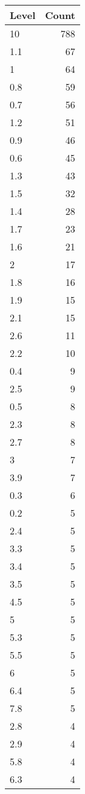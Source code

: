 \begin{table}[ht]
\centering
\begin{tabular}{lr}
  \hline
Level & Count \\ 
  \hline
10 & 788 \\ 
  1.1 &  67 \\ 
  1 &  64 \\ 
  0.8 &  59 \\ 
  0.7 &  56 \\ 
  1.2 &  51 \\ 
  0.9 &  46 \\ 
  0.6 &  45 \\ 
  1.3 &  43 \\ 
  1.5 &  32 \\ 
  1.4 &  28 \\ 
  1.7 &  23 \\ 
  1.6 &  21 \\ 
  2 &  17 \\ 
  1.8 &  16 \\ 
  1.9 &  15 \\ 
  2.1 &  15 \\ 
  2.6 &  11 \\ 
  2.2 &  10 \\ 
  0.4 &   9 \\ 
  2.5 &   9 \\ 
  0.5 &   8 \\ 
  2.3 &   8 \\ 
  2.7 &   8 \\ 
  3 &   7 \\ 
  3.9 &   7 \\ 
  0.3 &   6 \\ 
  0.2 &   5 \\ 
  2.4 &   5 \\ 
  3.3 &   5 \\ 
  3.4 &   5 \\ 
  3.5 &   5 \\ 
  4.5 &   5 \\ 
  5 &   5 \\ 
  5.3 &   5 \\ 
  5.5 &   5 \\ 
  6 &   5 \\ 
  6.4 &   5 \\ 
  7.8 &   5 \\ 
  2.8 &   4 \\ 
  2.9 &   4 \\ 
  5.8 &   4 \\ 
  6.3 &   4 \\ 

\end{tabular}
\end{table}
